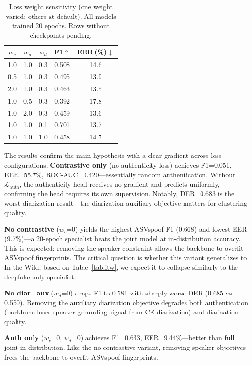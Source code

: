 \documentclass{article}
\begin{document}
\begin{table}[t]
  \caption{Loss weight sensitivity (one weight varied; others at default).
    All models trained 20 epochs. Rows without checkpoints pending.}
  \label{tab:lw}
  \centering
  \small
  \begin{tabular}{ccccc}
    \toprule
    $w_c$ & $w_a$ & $w_d$ & \textbf{F1}$\uparrow$ & \textbf{EER\,(\%)}$\downarrow$ \\
    \midrule
    1.0 & 1.0 & 0.3 & 0.508 & 14.6 \\
    0.5 & 1.0 & 0.3 & 0.495 & 13.9 \\
    2.0 & 1.0 & 0.3 & 0.463 & 13.5 \\
    1.0 & 0.5 & 0.3 & 0.392 & 17.8 \\
    1.0 & 2.0 & 0.3 & 0.459 & 13.6 \\
    1.0 & 1.0 & 0.1 & 0.701 & 13.7 \\
    1.0 & 1.0 & 1.0 & 0.458 & 14.7 \\
    \bottomrule
  \end{tabular}
\end{table}

The results confirm the main hypothesis with a clear gradient across loss
configurations. \textbf{Contrastive only} (no authenticity loss) achieves
F1=0.051, EER=55.7\%, ROC-AUC=0.420---essentially random authentication.
Without $\mathcal{L}_{\text{auth}}$, the authenticity head receives no
gradient and predicts uniformly, confirming the head requires its own
supervision. Notably, DER=0.683 is the worst diarization result---the
diarization auxiliary objective matters for clustering quality.

\textbf{No contrastive} ($w_c$=0) yields the highest ASVspoof F1 (0.668)
and lowest EER (9.7\%)---a 20-epoch specialist beats the joint model at
in-distribution accuracy. This is expected: removing the speaker constraint
allows the backbone to overfit ASVspoof fingerprints. The critical question
is whether this variant generalizes to In-the-Wild; based on Table~\ref{tab:itw},
we expect it to collapse similarly to the deepfake-only specialist.

\textbf{No diar.\ aux} ($w_d$=0) drops F1 to 0.581 with sharply worse DER
(0.685 vs 0.550). Removing the auxiliary diarization objective degrades both
authentication (backbone loses speaker-grounding signal from CE diarization)
and diarization quality.

\textbf{Auth only} ($w_c$=0, $w_d$=0) achieves F1=0.633, EER=9.44\%---better
than full joint in-distribution. Like the no-contrastive variant, removing
speaker objectives frees the backbone to overfit ASVspoof fingerprints.
\end{document}
